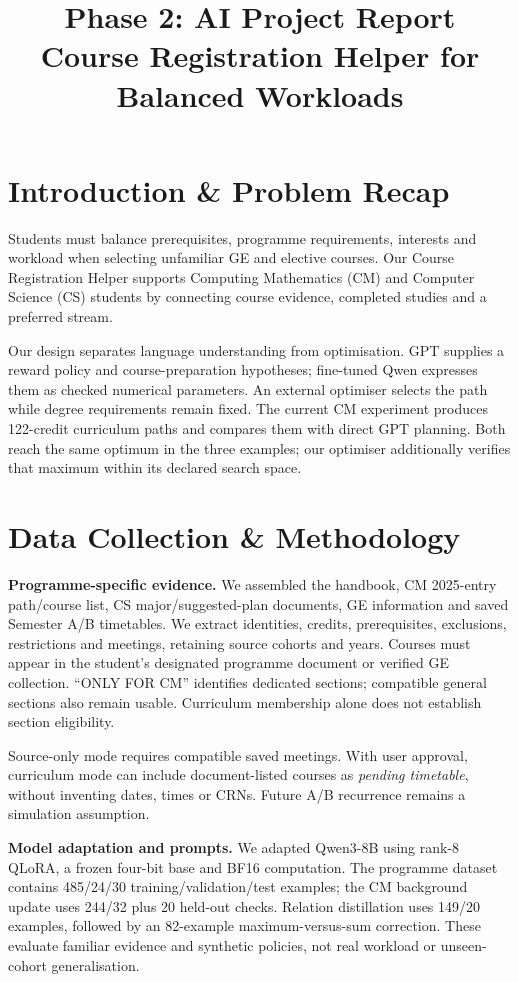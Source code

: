 \documentclass{article}
\title{Phase 2: AI Project Report\\
\large Course Registration Helper for Balanced Workloads}
\author{}
\begin{document}
\maketitle
\section{Introduction \& Problem Recap}
Students must balance prerequisites, programme requirements, interests and workload when selecting unfamiliar GE and elective courses. Our Course Registration Helper supports Computing Mathematics (CM) and Computer Science (CS) students by connecting course evidence, completed studies and a preferred stream.

Our design separates language understanding from optimisation. GPT supplies a reward policy and course-preparation hypotheses; fine-tuned Qwen expresses them as checked numerical parameters. An external optimiser selects the path while degree requirements remain fixed. The current CM experiment produces 122-credit curriculum paths and compares them with direct GPT planning. Both reach the same optimum in the three examples; our optimiser additionally verifies that maximum within its declared search space.

\section{Data Collection \& Methodology}
\textbf{Programme-specific evidence.} We assembled the handbook, CM 2025-entry path/course list, CS major/suggested-plan documents, GE information and saved Semester A/B timetables\citep{cityu-programmes}. We extract identities, credits, prerequisites, exclusions, restrictions and meetings, retaining source cohorts and years. Courses must appear in the student's designated programme document or verified GE collection. ``ONLY FOR CM'' identifies dedicated sections; compatible general sections also remain usable. Curriculum membership alone does not establish section eligibility.

Source-only mode requires compatible saved meetings. With user approval, curriculum mode can include document-listed courses as \emph{pending timetable}, without inventing dates, times or CRNs. Future A/B recurrence remains a simulation assumption.

\textbf{Model adaptation and prompts.} We adapted Qwen3-8B using rank-8 QLoRA, a frozen four-bit base and BF16 computation\citep{qwen,qlora}. The programme dataset contains 485/24/30 training/validation/test examples; the CM background update uses 244/32 plus 20 held-out checks. Relation distillation uses 149/20 examples, followed by an 82-example maximum-versus-sum correction. These evaluate familiar evidence and synthetic policies, not real workload or unseen-cohort generalisation.
\end{document}
